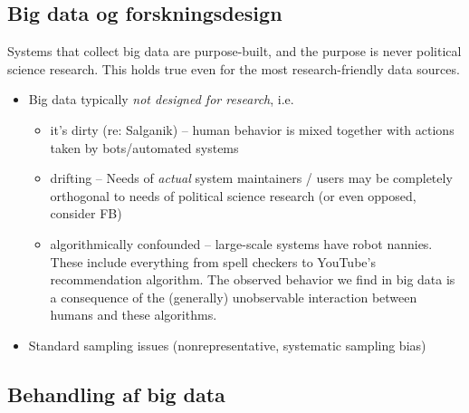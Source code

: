 \documentclass[12pt,]{article}
\providecommand{\tightlist}{%
  \setlength{\itemsep}{0pt}\setlength{\parskip}{0pt}}
\begin{document}
\hypertarget{big-data-og-forskningsdesign}{%
\subsection{Big data og
forskningsdesign}\label{big-data-og-forskningsdesign}}

Systems that collect big data are purpose-built, and the purpose is
never political science research. This holds true even for the most
research-friendly data sources.

\begin{itemize}
\tightlist
\item
  Big data typically \emph{not designed for research}, i.e.

  \begin{itemize}
  \tightlist
  \item
    it's dirty (re: Salganik) -- human behavior is mixed together with
    actions taken by bots/automated systems
  \item
    drifting -- Needs of \emph{actual} system maintainers / users may be
    completely orthogonal to needs of political science research (or
    even opposed, consider FB)
  \item
    algorithmically confounded -- large-scale systems have robot
    nannies. These include everything from spell checkers to YouTube's
    recommendation algorithm. The observed behavior we find in big data
    is a consequence of the (generally) unobservable interaction between
    humans and these algorithms.
  \end{itemize}
\item
  Standard sampling issues (nonrepresentative, systematic sampling bias)
\end{itemize}

\hypertarget{behandling-af-big-data}{%
\subsection{Behandling af big data}\label{behandling-af-big-data}}
\end{document}
